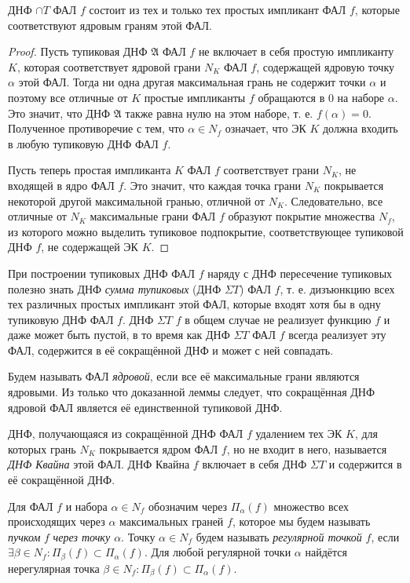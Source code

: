 \documentclass[11pt]{article}
\newcounter{lem}\setcounter{lem}{0}
\def\lm{\par\smallskip\refstepcounter{lem}\textbf{\arabic{lem}}}
\newtheorem*{Lemma}{Лемма \lm}
\newcounter{th}\setcounter{th}{0}
\begin{document}
  \begin{Lemma}
ДНФ $\cap T$ ФАЛ $f$ состоит из тех и только тех простых импликант ФАЛ $f$, которые соответствуют ядровым граням этой ФАЛ.
  \end{Lemma}
  \begin{proof}
Пусть тупиковая ДНФ $\mathfrak{A}$ ФАЛ $f$ не включает в себя простую импликанту $K$, которая соответствует ядровой грани $N_K$ ФАЛ $f$, содержащей ядровую точку $\alpha$ этой ФАЛ. Тогда ни одна другая максимальная грань не содержит точки $\alpha$ и поэтому все отличные от $K$ простые импликанты $f$ обращаются в 0 на наборе $\alpha$. Это значит, что ДНФ $\mathfrak{A}$ также равна нулю на этом наборе, т. е. $f(\alpha) = 0$. Полученное противоречие с тем, что $\alpha \in N_f$ означает, что ЭК $K$ должна входить в любую тупиковую ДНФ ФАЛ $f$.

Пусть теперь простая импликанта $K$ ФАЛ $f$ соответствует грани $N_K$, не входящей в ядро ФАЛ $f$. Это значит, что каждая точка грани $N_K$ покрывается некоторой другой максимальной гранью, отличной от $N_K$. Следовательно, все отличные от $N_K$ максимальные грани ФАЛ $f$ образуют покрытие множества $N_f$, из которого можно выделить тупиковое подпокрытие, соответствующее тупиковой ДНФ $f$, не содержащей ЭК $K$.
  \end{proof}

При построении тупиковых ДНФ ФАЛ \(f\) наряду с ДНФ пересечение тупиковых полезно знать ДНФ \emph{сумма тупиковых} (ДНФ \(\Sigma T\)) ФАЛ \(f\), т. е. дизъюнкцию всех тех различных простых импликант этой ФАЛ, которые входят хотя бы в одну тупиковую ДНФ ФАЛ \(f\). ДНФ \(\Sigma T\) \(f\) в общем случае не реализует функцию \(f\) и даже может быть пустой, в то время как ДНФ \(\Sigma T\) ФАЛ \(f\) всегда реализует эту ФАЛ, содержится в её сокращённой ДНФ и может с ней совпадать.

Будем называть ФАЛ \emph{ядровой}, если все её максимальные грани являются ядровыми. Из только что доказанной леммы следует, что сокращённая ДНФ ядровой ФАЛ является её единственной тупиковой ДНФ.

ДНФ, получающаяся из сокращённой ДНФ ФАЛ \(f\) удалением тех ЭК \(K\), для которых грань \(N_K\) покрывается ядром ФАЛ \(f\), но не входит в него, называется \emph{ДНФ Квайна} этой ФАЛ. ДНФ Квайна \(f\) включает в себя ДНФ \(\Sigma T\) и содержится в её сокращённой ДНФ.

Для ФАЛ \(f\) и набора \(\alpha \in N_f\) обозначим через \(\Pi_{\alpha}(f)\) множество всех происходящих через \(\alpha\) максимальных граней \(f\), которое мы будем называть \emph{пучком} \(f\) \emph{через точку \(\alpha\)}. Точку \(\alpha \in N_f\) будем называть \emph{регулярной точкой} \(f\), если \(\exists \beta \in N_f: \Pi_{\beta}(f) \subset \Pi_{\alpha}(f)\). Для любой регулярной точки \(\alpha\) найдётся нерегулярная точка \(\beta \in N_f: \Pi_{\beta}(f) \subset \Pi_{\alpha}(f)\).
\end{document}
